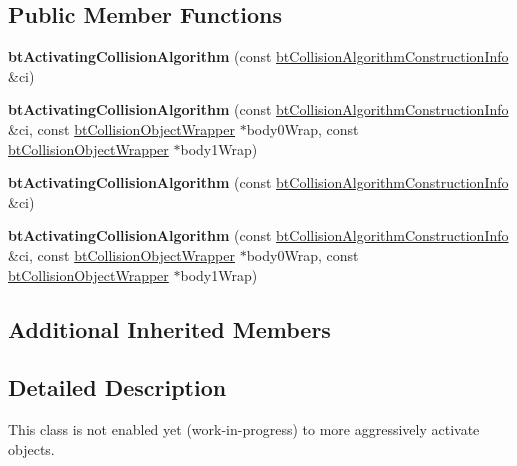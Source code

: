 \subsection*{Public Member Functions}
\begin{DoxyCompactItemize}
\item 
\mbox{\label{classbtActivatingCollisionAlgorithm_a8445dd4e3085b72cd76c9773fccea861}} 
{\bfseries bt\+Activating\+Collision\+Algorithm} (const \hyperlink{structbtCollisionAlgorithmConstructionInfo}{bt\+Collision\+Algorithm\+Construction\+Info} \&ci)
\item 
\mbox{\label{classbtActivatingCollisionAlgorithm_a18fd97f6b072beb8d3a6da153e831441}} 
{\bfseries bt\+Activating\+Collision\+Algorithm} (const \hyperlink{structbtCollisionAlgorithmConstructionInfo}{bt\+Collision\+Algorithm\+Construction\+Info} \&ci, const \hyperlink{structbtCollisionObjectWrapper}{bt\+Collision\+Object\+Wrapper} $\ast$body0\+Wrap, const \hyperlink{structbtCollisionObjectWrapper}{bt\+Collision\+Object\+Wrapper} $\ast$body1\+Wrap)
\item 
\mbox{\label{classbtActivatingCollisionAlgorithm_a8445dd4e3085b72cd76c9773fccea861}} 
{\bfseries bt\+Activating\+Collision\+Algorithm} (const \hyperlink{structbtCollisionAlgorithmConstructionInfo}{bt\+Collision\+Algorithm\+Construction\+Info} \&ci)
\item 
\mbox{\label{classbtActivatingCollisionAlgorithm_a18fd97f6b072beb8d3a6da153e831441}} 
{\bfseries bt\+Activating\+Collision\+Algorithm} (const \hyperlink{structbtCollisionAlgorithmConstructionInfo}{bt\+Collision\+Algorithm\+Construction\+Info} \&ci, const \hyperlink{structbtCollisionObjectWrapper}{bt\+Collision\+Object\+Wrapper} $\ast$body0\+Wrap, const \hyperlink{structbtCollisionObjectWrapper}{bt\+Collision\+Object\+Wrapper} $\ast$body1\+Wrap)
\end{DoxyCompactItemize}
\subsection*{Additional Inherited Members}


\subsection{Detailed Description}
This class is not enabled yet (work-\/in-\/progress) to more aggressively activate objects. 

